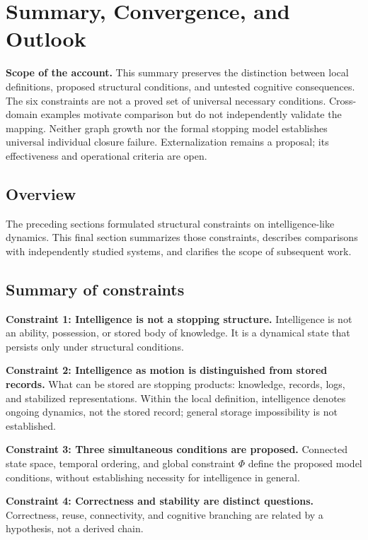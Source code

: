 \section{Summary, Convergence, and Outlook}

\noindent\textbf{Scope of the account.} This summary preserves the distinction between local definitions, proposed structural conditions, and untested cognitive consequences. The six constraints are not a proved set of universal necessary conditions. Cross-domain examples motivate comparison but do not independently validate the mapping. Neither graph growth nor the formal stopping model establishes universal individual closure failure. Externalization remains a proposal; its effectiveness and operational criteria are open.


\subsection{Overview}

The preceding sections formulated structural constraints on intelligence-like dynamics. This final section summarizes those constraints, describes comparisons with independently studied systems, and clarifies the scope of subsequent work.

\subsection{Summary of constraints}

\textbf{Constraint 1: Intelligence is not a stopping structure.}
Intelligence is not an ability, possession, or stored body of knowledge. It is a dynamical state that persists only under structural conditions.

\textbf{Constraint 2: Intelligence as motion is distinguished from stored records.}
What can be stored are stopping products: knowledge, records, logs, and stabilized representations. Within the local definition, intelligence denotes ongoing dynamics, not the stored record; general storage impossibility is not established.

\textbf{Constraint 3: Three simultaneous conditions are proposed.}
Connected state space, temporal ordering, and global constraint $\Phi$ define the proposed model conditions, without establishing necessity for intelligence in general.

\textbf{Constraint 4: Correctness and stability are distinct questions.}
Correctness, reuse, connectivity, and cognitive branching are related by a hypothesis, not a derived chain.

